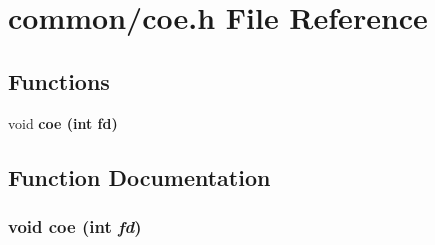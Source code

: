 \section{common/coe.h File Reference}
\label{coe_8h}
\subsection*{Functions}
\begin{CompactItemize}
\item 
void \bf{coe} (int fd)
\end{CompactItemize}


\subsection{Function Documentation}
\subsubsection{\setlength{\rightskip}{0pt plus 5cm}void coe (int {\em fd})}\label{coe_8h_587345f42a7b764bb0b86a7a0695260d}


